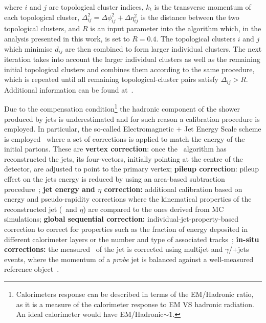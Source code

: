 				\noindent where $i$ and $j$ are topological cluster indices, $k_t$ is the transverse momentum of each topological cluster, $\Delta_{ij}^2 = \Delta \phi_{ij}^2 + \Delta \eta_{ij}^2 $ is the distance between the two topological clusters, and $R$ is an input parameter into the algorithm which, in the analysis presented in this work, is set to $R = 0.4$. The topological clusters $i$ and $j$ which minimise $d_{ij}$ are then combined to form larger individual clusters. The next iteration takes into account the larger individual clusters as well as the remaining initial topological clusters and combines them according to the same procedure, which is repeated until all remaining topological-cluster pairs satisfy $\Delta_{ij}> R$. Additional information can be found at~\cite{Antikt2008}.


				Due to the compensation condition\footnote{Calorimeters response can be described in terms of the \ac{EM}/Hadronic ratio, as it is a measure of the calorimeter response to \ac{EM} VS hadronic radiation. An ideal calorimeter would have \ac{EM}/Hadronic$\sim1$.} the hadronic component of the shower produced by jets is underestimated and for such reason a calibration procedure is employed. In particular, the so-called Electromagnetic + Jet Energy Scale scheme is employed~\cite{ATL-PHYS-PUB-2015-015} where a set of corrections is applied to match the energy of the initial partons. These are \textbf{vertex correction}: once the \antikt\ algorithm has reconstructed the jets, its four-vectors, initially pointing at the centre of the detector, are adjusted to point to the primary vertex; \textbf{pileup correction}: pileup effect on the jets energy is reduced by using an area-based subtraction procedure~\cite{TheATLAScollaboration:2013pia}; \textbf{jet energy and $\eta$ correction:} additional calibration based on energy and pseudo-rapidity corrections where the kinematical properties of the reconstructed jet (\pt\ and $\eta$) are compared to the ones derived from \ac{MC} simulations; \textbf{global sequential correction:} individual-jet-property-based correction to correct for properties such as the fraction of energy deposited in different calorimeter layers or the number and type of associated tracks~\cite{ATLAS:2015oia}; \textbf{in-situ corrections:} the measured \pt\ of the jet is corrected using multijet and $\gamma$/\Zboson+jets events, where the momentum of a \emph{probe} jet is balanced against a well-measured reference object~\cite{ATLAS-CONF-2015-017}.


